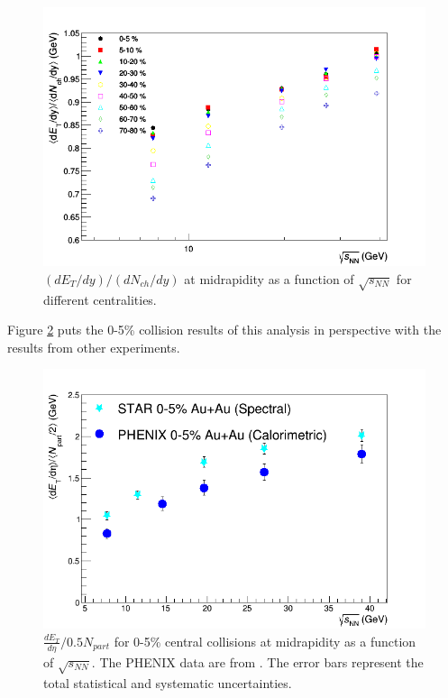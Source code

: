 	\begin{figure}[h]
	  \centering
	  \includegraphics[width=5.5in]{figures/finalStacked/dETdyOverdNchdySumCent8s.png}
	  \caption{$(dE_{T}/dy)/(dN_{ch}/dy)$ at midrapidity as a function of $\sqrt{s_{NN}}$ for different centralities.}\label{fig:dETdyOverdNchdySumCents}
	\end{figure}
	
Figure \ref{fig:comparison} puts the 0-5\% collision results of this analysis in perspective with the results from other experiments.
	\begin{figure}[h]
	  \centering
	  \includegraphics[width=4.5in]{figures/PHENIX_comparison2.png}
	  \caption{$\frac{dE_{T}}{d\eta}/0.5N_{part}$ for 0-5\% central collisions at midrapidity as a function of $\sqrt{s_{NN}}$. The PHENIX data are from \cite{PhysRevC.93.024901}. The error bars represent the total statistical and systematic uncertainties.}\label{fig:comparison}
	\end{figure}
	
	
	
